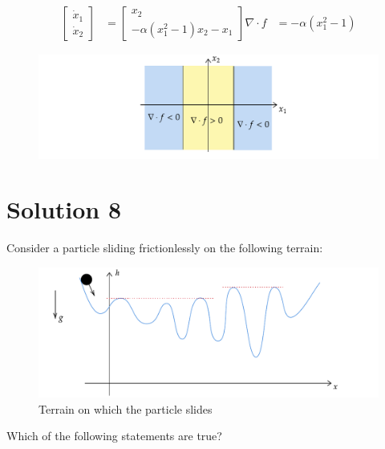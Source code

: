 \documentclass[twoside,10pt,a4paper]{article}
\begin{document}
{\color{MyRed}
\begin{align*}
	\begin{bmatrix}
		\dot{x}_1 \\ \dot{x}_2
	\end{bmatrix} &= \begin{bmatrix}
		x_2 \\
		-\alpha (x_1^2 - 1)x_2 - x_1
	\end{bmatrix}
	\nabla \cdot f &= -\alpha (x_1^2 - 1)
\end{align*}

\begin{figure}[H]
	\centering
	\includegraphics[scale=0.9]{Graphics/MCQ2_figures/Q05D01.pdf}
\end{figure}
}

\section*{Solution 8}
Consider a particle sliding frictionlessly on the following terrain:

\begin{figure}[H]
	\centering
	\includegraphics[scale=0.9]{Graphics/MCQ2_figures/Q09D01.pdf}
	\caption{Terrain on which the particle slides}
\end{figure}

Which of the following statements are true?
\end{document}
